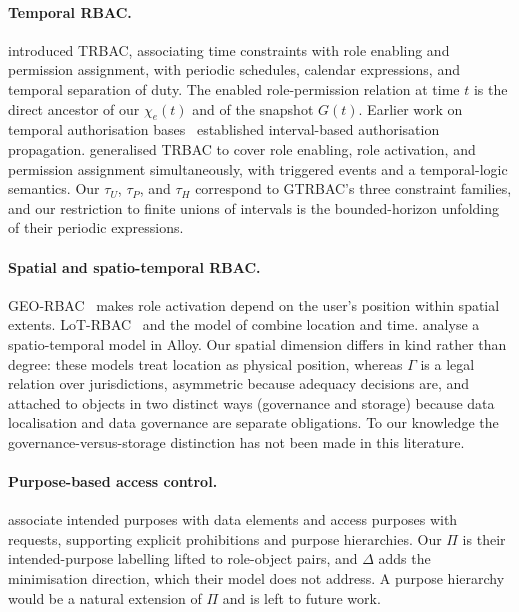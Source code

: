 \documentclass[11pt]{article}
\theoremstyle{definition}
\theoremstyle{plain}
\theoremstyle{remark}
\begin{document}
\paragraph{Temporal RBAC.} \citet{bertino2001trbac} introduced TRBAC,
associating time constraints with role enabling and permission assignment, with
periodic schedules, calendar expressions, and temporal separation of duty. The
enabled role-permission relation at time $t$ is the direct ancestor of our
$\chi_e(t)$ and of the snapshot $G(t)$. Earlier work on temporal authorisation
bases~\citep{bertino2000tab} established interval-based authorisation
propagation. \citet{joshi2005gtrbac} generalised TRBAC to cover role enabling,
role activation, and permission assignment simultaneously, with triggered events
and a temporal-logic semantics. Our $\tau_U$, $\tau_P$, and $\tau_H$ correspond
to GTRBAC's three constraint families, and our restriction to finite unions of
intervals is the bounded-horizon unfolding of their periodic expressions.

\paragraph{Spatial and spatio-temporal RBAC.} GEO-RBAC~\citep{bertino2005georbac}
makes role activation depend on the user's position within spatial extents.
LoT-RBAC~\citep{chandran2005lotrbac} and the model of
\citet{ray2007strbac} combine location and time.
\citet{toahchoodee2009alloy} analyse a spatio-temporal model in Alloy. Our
spatial dimension differs in kind rather than degree: these models treat
location as physical position, whereas $\Gamma$ is a legal relation over
jurisdictions, asymmetric because adequacy decisions are, and attached to
objects in two distinct ways (governance and storage) because data localisation
and data governance are separate obligations. To our knowledge the
governance-versus-storage distinction has not been made in this literature.

\paragraph{Purpose-based access control.} \citet{byun2008purpose} associate
intended purposes with data elements and access purposes with requests,
supporting explicit prohibitions and purpose hierarchies. Our $\Pi$ is their
intended-purpose labelling lifted to role-object pairs, and $\Delta$ adds the
minimisation direction, which their model does not address. A purpose hierarchy
would be a natural extension of $\Pi$ and is left to future work.
\end{document}
